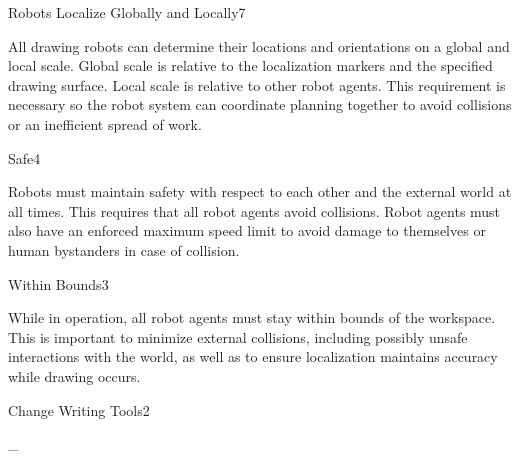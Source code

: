 \begin{functional_requirement}{Robots Localize Globally and Locally}{7}
\item All drawing robots can determine their locations and orientations on a global and local scale. Global scale is relative to the localization markers and the specified drawing surface. Local scale is relative to other robot agents. This requirement is necessary so the robot system can coordinate planning together to avoid collisions or an inefficient spread of work. 
\end{functional_requirement}

\begin{functional_requirement}{Safe}{4}
\item Robots must maintain safety with respect to each other and the external world at all times. This requires that all robot agents avoid collisions. Robot agents must also have an enforced maximum speed limit to avoid damage to themselves or human bystanders in case of collision. 
\end{functional_requirement}

\begin{functional_requirement}{Within Bounds}{3}
\item While in operation, all robot agents must stay within bounds of the workspace. This is important to minimize external collisions, including possibly unsafe interactions with the world, as well as to ensure localization maintains accuracy while drawing occurs.
\end{functional_requirement}

\begin{functional_requirement}{Change Writing Tools}{2}
\item \_ 
\end{functional_requirement}

